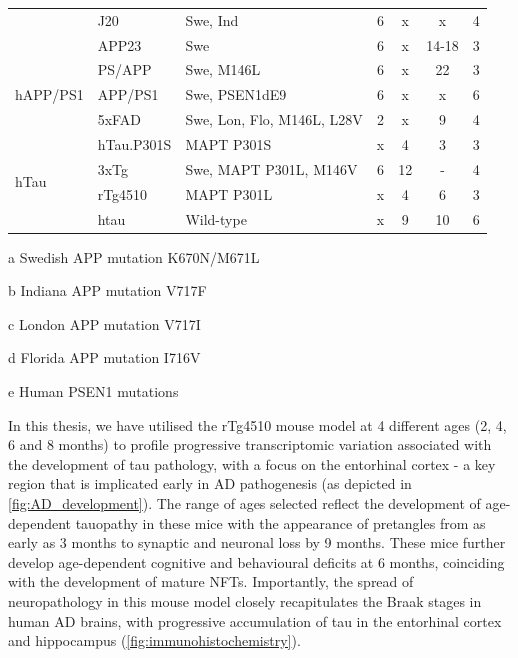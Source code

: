 \begin{table}[h]
\begin{threeparttable}
\begin{tabular}{@{}lllcccc@{}}
			& J20                   & Swe\tnote{a}, Ind\tnote{b} & 6  & x  & x     & 4                \\
			& APP23                 & Swe\tnote{a}               & 6  & x  & 14-18 & 3                \\
			\multirow{3}{*}{hAPP/PS1} & PS/APP & Swe\tnote{a}, M146L\tnote{e}                 & 6  & x  & 22    & 3                \\
			& APP/PS1         & Swe\tnote{a}, PSEN1dE9              & 6  & x  & x     & 6                \\
			& 5xFAD                 & Swe\tnote{a}, Lon\tnote{c}, Flo\tnote{d}, M146L\tnote{e}, L28V\tnote{e} & 2  & x  & 9     & 4                \\
			\multirow{4}{*}{hTau}     & hTau.P301S            & MAPT P301S                 & x  & 4  & 3     & 3                \\
			& 3xTg                  & Swe\tnote{a}, MAPT P301L, M146V\tnote{e}     & 6  & 12 & -    & 4                \\
			& rTg4510               & MAPT P301L                 & x  & 4  & 6     & 3                \\
			& htau                  & Wild-type                   & x  & 9  & 10    & 6                \\ \cmidrule(l){1-7} 
		\end{tabular}
		\begin{tablenotes}
			\footnotesize
			\item[a] Swedish APP mutation K670N/M671L
			\item[b] Indiana APP mutation V717F
			\item[c] London APP mutation V717I
			\item[d] Florida APP mutation I716V 
			\item[e] Human PSEN1 mutations 
		\end{tablenotes}
	\end{threeparttable}
\end{table}

In this thesis, we have utilised the rTg4510 mouse model at 4 different ages (2, 4, 6 and 8 months) to profile progressive transcriptomic variation associated with the development of tau pathology, with a focus on the entorhinal cortex - a key region that is implicated early in AD pathogenesis (as depicted in \cref{fig:AD_development}). The range of ages selected reflect the development of age-dependent tauopathy in these mice with the appearance of pretangles from as early as 3 months to synaptic and neuronal loss by 9 months. These mice further develop age-dependent cognitive and behavioural deficits at 6 months, coinciding with the development of mature NFTs\cite{Cook2014}. Importantly, the spread of neuropathology in this mouse model closely recapitulates the Braak stages in human AD brains, with progressive accumulation of tau in the entorhinal cortex and hippocampus (\cref{fig:immunohistochemistry}). 

